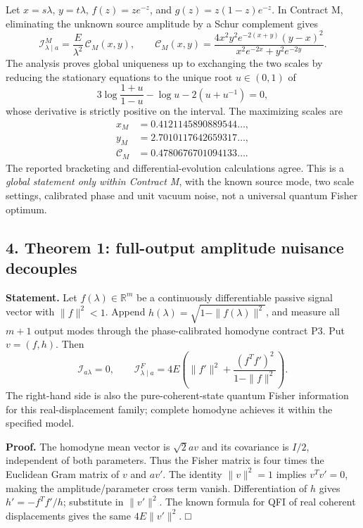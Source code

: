 \documentclass[
  10pt,
  a4paper,
]{article}
\begin{document}
Let \(x=s\lambda\), \(y=t\lambda\), \(f(z)=ze^{-z}\), and \(g(z)=z(1-z)e^{-z}\). In Contract M, eliminating the unknown source amplitude by a Schur complement gives \[
 \mathcal I^{M}_{\lambda\mid a}=\frac E{\lambda^2}\,\mathcal C_M(x,y),\qquad
 \mathcal C_M(x,y)=\frac{4x^2y^2e^{-2(x+y)}(y-x)^2}{x^2e^{-2x}+y^2e^{-2y}}.
\] The analysis proves global uniqueness up to exchanging the two scales by reducing the stationary equations to the unique root \(u\in(0,1)\) of \[
 3\log\frac{1+u}{1-u}-\log u-2(u+u^{-1})=0,
\] whose derivative is strictly positive on the interval. The maximizing scales are \[
\begin{aligned}
 x_M&=0.4121145890889544\ldots,\\ y_M&=2.7010117642659317\ldots,\\
 \mathcal C_M&=0.4780676701094133\ldots.
\end{aligned}
\] The reported bracketing and differential-evolution calculations agree. This is a \emph{global statement only within Contract M}, with the known source mode, two scale settings, calibrated phase and unit vacuum noise, not a universal quantum Fisher optimum.

\subsection{4. Theorem 1: full-output amplitude nuisance decouples}\label{theorem-1-full-output-amplitude-nuisance-decouples}

\textbf{Statement.} Let \(f(\lambda)\in\mathbb R^m\) be a continuously differentiable passive signal vector with \(\|f\|^2<1\). Append \(h(\lambda)=\sqrt{1-\|f(\lambda)\|^2}\), and measure all \(m+1\) output modes through the phase-calibrated homodyne contract P3. Put \(v=(f,h)\). Then \[
 \boxed{\mathcal I_{a\lambda}=0,\qquad
 \mathcal I^{F}_{\lambda\mid a}=4E\left(\|f'\|^2+
 \frac{(f^Tf')^2}{1-\|f\|^2}\right).}
\] The right-hand side is also the pure-coherent-state quantum Fisher information for this real-displacement family; complete homodyne achieves it within the specified model.

\textbf{Proof.} The homodyne mean vector is \(\sqrt2 a v\) and its covariance is \(I/2\), independent of both parameters. Thus the Fisher matrix is four times the Euclidean Gram matrix of \(v\) and \(a v'\). The identity \(\|v\|^2=1\) implies \(v^Tv'=0\), making the amplitude/parameter cross term vanish. Differentiation of \(h\) gives \(h'=-f^Tf'/h\); substitute in \(\|v'\|^2\). The known formula for QFI of real coherent displacements gives the same \(4E\|v'\|^2\). □
\end{document}
